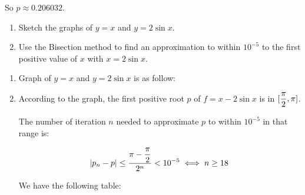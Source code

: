 \documentclass[../../Assignments.tex]{subfiles}
\begin{document}
\begin{solution}
\begin{enumerate}
            So \(p \approx \num{0.206032}\).
    \end{enumerate}
\end{solution}

\begin{exercise}
    \begin{enumerate}[label=(\alph*)]
        \item Sketch the graphs of \(y = x\) and \(y = 2 \sin{x}\).
        \item Use the Bisection method to find an approximation to within
            \(10^{−5}\) to the first positive value of \(x\) with \(x = 2
            \sin{x}\).
    \end{enumerate}
\end{exercise}

\begin{solution}
    \begin{enumerate}[label=(\alph*)]
        \item Graph of \(y = x\) and \(y = 2 \sin{x}\) is as follow:

            

        \item According to the graph, the first positive root \(p\) of \(f = x -
            2 \sin{x}\) is in \(\interval{\dfrac{\pi}{2}}{\pi}\).

            The number of iteration \(n\) needed to approximate \(p\) to within
            \(10^{-5}\) in that range is:

            \[\abs{p_n - p} \leq \frac{\pi - \dfrac{\pi}{2}}{2^n} < 10^{-5} \iff n \geq 18\]

            We have the following table:


\end{enumerate}
\end{solution}
\end{document}
